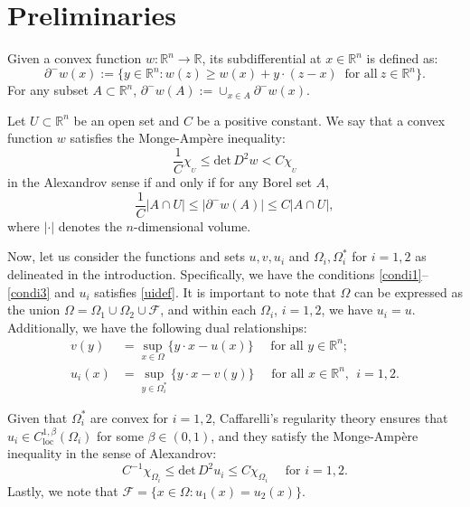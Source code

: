 \documentclass[10pt,a4paper]{amsart}
\theoremstyle{plain}
\renewcommand{\det}{\mbox{det}}
\newcommand{\0}{\textbf{0}}
\numberwithin{equation}{section}
\numberwithin{equation}{section}
\numberwithin{figure}{section}
\begin{document}
\section{Preliminaries}\label{S2} 

Given a convex function $w: \mathbb{R}^n \rightarrow \mathbb{R}$, its subdifferential at $x \in \mathbb{R}^n$ is defined as:
\begin{equation}
\partial^{-}w(x) := \{y \in \mathbb{R}^n : w(z) \geq w(x) + y \cdot (z - x) \ \text{ for all} \ z \in \mathbb{R}^n\}.
\end{equation}
For any subset $A\subset\mathbb{R}^n$, $\partial^{-}w(A):=\cup_{x\in A}\partial^{-}w(x)$.

Let $U \subset \mathbb{R}^n$ be an open set and $C$ be a positive constant. 
We say that a convex function $w$ satisfies the Monge-Ampère inequality:
\begin{equation}
\frac{1}{C} \chi_{_U} \leq \det\, D^2w < C \chi_{_U}
\end{equation}
in the Alexandrov sense if and only if for any Borel set $A$,
\begin{equation}\label{aama}
\frac{1}{C} |A \cap U| \leq |\partial^-w(A)| \leq C |A \cap U|,
\end{equation}
where $|\cdot|$ denotes the $n$-dimensional volume. 

Now,
let us consider the functions and sets $u, v, u_i$ and $\Omega_i, \Omega^*_i$ for $i=1, 2$ as delineated in the introduction. 
Specifically, we have the conditions \eqref{condi1}--\eqref{condi3} and $u_i$ satisfies \eqref{uidef}. 
It is important to note that $\Omega$ can be expressed as the union $\Omega = \Omega_1\cup \Omega_2\cup\mathcal{F}$, and within each $\Omega_i$, $i=1,2$, we have $u_i = u$. 
Additionally, we have the following dual relationships:
\begin{align}
	 v(y) &= \sup_{x\in \Omega}\{y\cdot x - u(x)\} \quad \text{ for all } y\in \mathbb{R}^n; \label{dual111} \\
	 u_i(x) &= \sup_{y\in \Omega_i^*}\{y\cdot x - v(y)\} \quad \text{ for all } x\in \mathbb{R}^n,\ \ i=1,2. \label{dual222}
\end{align} 

Given that $\Omega^*_i$ are convex for $i=1, 2$, Caffarelli's regularity theory \cite{C92} ensures that $u_i\in C^{1,\beta}_{\text{loc}}(\Omega_i)$ for some $\beta\in(0,1)$, and they satisfy the Monge-Ampère inequality in the sense of Alexandrov:
\begin{equation}\label{Asolv} 
    C^{-1}\chi_{\Omega_i} \leq \det\, D^2 u_i \leq C\chi_{\Omega_i} \quad \text{ for } i=1, 2.
\end{equation}
Lastly, we note that $\mathcal{F}=\{x\in\Omega: u_1(x)=u_2(x)\}$.
\end{document}
